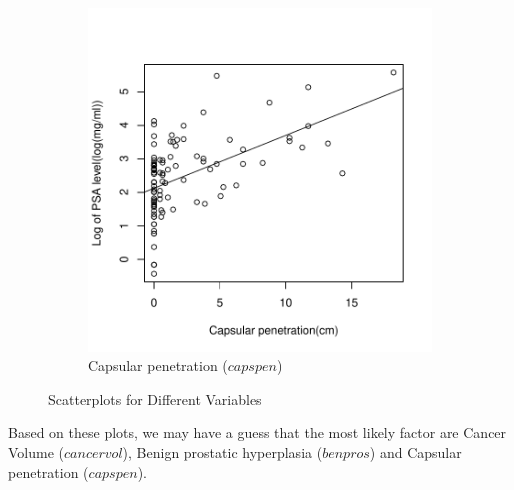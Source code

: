 \documentclass[12pt,letterpaper,titlepage,en-US]{article}
\begin{document}
\begin{figure}[H]
\begin{subfigure}[t]{0.5\textwidth}
    \end{subfigure}
    \\
    \begin{subfigure}[t]{0.5\textwidth}
        \centering
        \caption{Capsular penetration ($capspen$)}
        \includegraphics[width=.96\textwidth]{fig/boxplotcapspen.pdf}
    \end{subfigure}%
    \caption{Scatterplots for Different Variables}\label{b1}
\end{figure}

Based on these plots, we may have a guess that the most likely factor are Cancer Volume ($cancervol$), Benign prostatic hyperplasia ($benpros$) and Capsular penetration ($capspen$).
\end{document}
